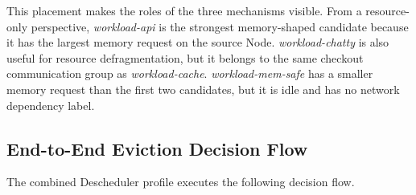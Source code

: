 \begin{table}[H]
    \centering
    \caption{End-to-End Use Case: Source Node Pods}
    \label{tab:e2e_source_pods}
    \renewcommand{\arraystretch}{1.2}
\end{table}

This placement makes the roles of the three mechanisms visible. From a resource-only perspective, \textit{workload-api} is the strongest memory-shaped candidate because it has the largest memory request on the source Node. \textit{workload-chatty} is also useful for resource defragmentation, but it belongs to the same checkout communication group as \textit{workload-cache}. \textit{workload-mem-safe} has a smaller memory request than the first two candidates, but it is idle and has no network dependency label.

\subsection{End-to-End Eviction Decision Flow}

The combined Descheduler profile executes the following decision flow.

